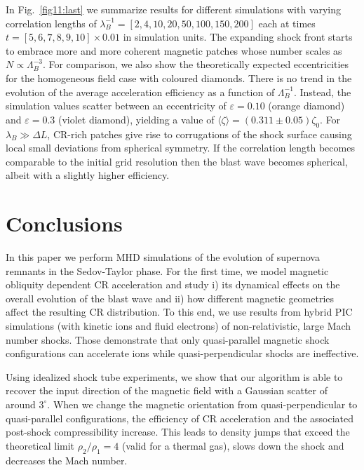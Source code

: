\documentclass[8pt,a4paper,usenatbib]{mnras}
\renewcommand{\epsilon}{\varepsilon}
\begin{document}
In Fig.~\ref{fig11:last} we summarize results for different simulations with
varying correlation lengths of $\lambda_B^{-1} = [2,4,10,20,50,100,150,200]$
each at times $t=[5,6,7,8,9,10]\times0.01$ in simulation units.  The expanding
shock front starts to embrace more and more coherent magnetic patches whose
number scales as $N \propto \Lambda_B^{-3}$. For comparison, we also show the
theoretically expected eccentricities for the homogeneous field case with
coloured diamonds. There is no trend in the evolution of the average
acceleration efficiency as a function of $\Lambda_B^{-1}$. Instead, the
simulation values scatter between an eccentricity of $\epsilon = 0.10$ (orange
diamond) and $\epsilon=0.3$ (violet diamond), yielding a value of $\langle \zeta
\rangle = (0.311 \pm 0.05) \zeta_0$.  For $\lambda_B\gg\Delta L$, CR-rich
patches give rise to corrugations of the shock surface causing local small
deviations from spherical symmetry. If the correlation length becomes comparable
to the initial grid resolution then the blast wave becomes spherical, albeit
with a slightly higher efficiency.


\section{Conclusions}
\label{sec:conclusions}

In this paper we perform MHD simulations of the evolution of supernova remnants
in the Sedov-Taylor phase. For the first time, we model magnetic obliquity
dependent CR acceleration and study i) its dynamical effects on the overall
evolution of the blast wave and ii) how different magnetic geometries affect the
resulting CR distribution. To this end, we use results from hybrid PIC
simulations (with kinetic ions and fluid electrons) of non-relativistic, large
Mach number shocks. Those demonstrate that only quasi-parallel magnetic shock
configurations can accelerate ions while quasi-perpendicular shocks are
ineffective.

Using idealized shock tube experiments, we show that our algorithm is able to
recover the input direction of the magnetic field with a Gaussian scatter of
around $3^\circ$. When we change the magnetic orientation from
quasi-perpendicular to quasi-parallel configurations, the efficiency of CR
acceleration and the associated post-shock compressibility increase. This leads
to density jumps that exceed the theoretical limit $\rho_2/\rho_1=4$ (valid for
a thermal gas), slows down the shock and decreases the Mach number.
\end{document}
